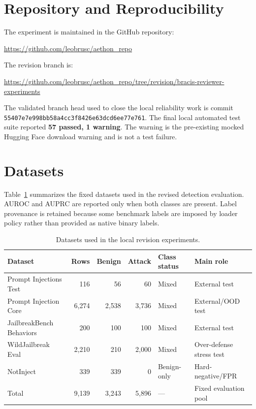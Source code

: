 \documentclass[11pt,a4paper]{article}
\begin{document}
\section{Repository and Reproducibility}
The experiment is maintained in the GitHub repository:

\begin{center}
\url{https://github.com/leobrusc/aethon_repo}
\end{center}

The revision branch is:

\begin{center}
\url{https://github.com/leobrusc/aethon_repo/tree/revision/bracis-reviewer-experiments}
\end{center}

The validated branch head used to close the local reliability work is commit
\texttt{55407e7e998bb58a4cc3f8426e63dcd6ee77e761}. The final local automated test suite reported \textbf{57 passed, 1 warning}. The warning is the pre-existing mocked Hugging Face download warning and is not a test failure.

\section{Datasets}
Table~\ref{tab:datasets} summarizes the fixed datasets used in the revised detection evaluation. AUROC and AUPRC are reported only when both classes are present. Label provenance is retained because some benchmark labels are imposed by loader policy rather than provided as native binary labels.

\begin{table}[H]
\centering
\caption{Datasets used in the local revision experiments.}
\label{tab:datasets}
\begin{tabular}{lrrrll}
\toprule
Dataset & Rows & Benign & Attack & Class status & Main role \\
\midrule
Prompt Injections Test & 116 & 56 & 60 & Mixed & External test \\
Prompt Injection Core & 6,274 & 2,538 & 3,736 & Mixed & External/OOD test \\
JailbreakBench Behaviors & 200 & 100 & 100 & Mixed & External test \\
WildJailbreak Eval & 2,210 & 210 & 2,000 & Mixed & Over-defense stress test \\
NotInject & 339 & 339 & 0 & Benign-only & Hard-negative/FPR \\
\midrule
Total & 9,139 & 3,243 & 5,896 & --- & Fixed evaluation pool \\
\bottomrule
\end{tabular}
\end{table}
\end{document}

